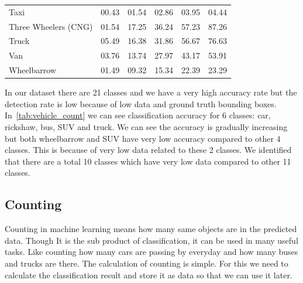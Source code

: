 \begin{table}[!h]
{\begin{tabular}{p{4.3cm} p{1cm} p{1cm} p{1cm} p{1cm} p{1cm}}
          Taxi                        & 00.43    &  01.54 & 02.86  & 03.95   & 04.44  \\
          Three Wheelers (CNG)        & 01.54    &  17.25 & 36.24  & 57.23   & 87.26  \\
          Truck                       & 05.49    &  16.38 & 31.86  & 56.67   & 76.63  \\
          Van                         & 03.76    &  13.74 & 27.97  & 43.17   & 53.91  \\
          Wheelbarrow                 & 01.49    &  09.32 & 15.34  & 22.39   & 23.29  \\
          \bottomrule
    \end{tabular}
  }
\end{table}



In our dataset there are 21 classes and we have a very high accuracy rate but the detection rate is low because of low data and ground truth bounding boxes. In~\ref{tab:vehicle_count} we can see classification accuracy for 6 classes: car, rickshaw, bus, SUV and truck. We can see the accuracy is gradually increasing but both wheelbarrow and SUV have very low accuracy compared to other 4 classes. This is because of very low data related to these 2 classes. We identified that there are a total 10 classes which have very low data compared to other 11 classes. 


\subsection{Counting} Counting in machine learning means how many same objects are in the predicted data. Though It is the sub product of classification, it can be used in many useful tasks. Like counting how many cars are passing by everyday and how many buses and trucks are there. The calculation of counting is simple. For this we need to calculate the classification result and store it as data so that we can use it later.

